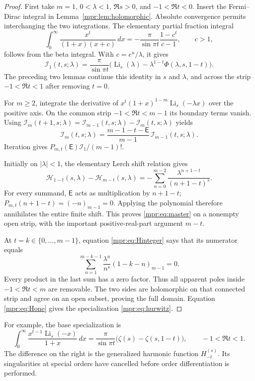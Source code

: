 \begin{proof}
First take $m=1$, $0<\lambda<1$, $\Re s>0$, and $-1<\Re t<0$.
Insert the Fermi--Dirac integral in Lemma~\ref{mpr:lem:holomorphic}.
Absolute convergence permits interchanging the two integrations.  The
elementary partial fraction integral
\[
 \int_0^\infty\frac{x^t}{(1+x)(x+c)}\,dx
  =-\frac{\pi}{\sin\pi t}\frac{1-c^t}{c-1},\qquad c>1,
\]
follows from the beta integral.  With $c=e^u/\lambda$, it gives
\[
 \mathcal I_1(t,s;\lambda)
 =\frac\pi{\sin\pi t}
       \bigl(\operatorname{Li}_s(\lambda)
           -\lambda^{1-t}\Phi(\lambda,s,1-t)\bigr).
\]
The preceding two lemmas continue this identity in $s$ and $\lambda$,
and across the strip $-1<\Re t<1$ after removing $t=0$.

For $m\ge2$, integrate the derivative of
$x^t(1+x)^{1-m}\operatorname{Li}_s(-\lambda x)$ over the positive
axis.  On the common strip $-1<\Re t<m-1$ its boundary terms vanish.
Using $\mathcal I_m(t+1,s;\lambda)
=\mathcal I_{m-1}(t,s;\lambda)-\mathcal I_m(t,s;\lambda)$ yields
\begin{equation}\label{mpr:eq:recurrence}
 \mathcal I_m(t,s;\lambda)
 =\frac{m-1-t-\mathsf E}{m-1}\,
                     \mathcal I_{m-1}(t,s;\lambda).
\end{equation}
Iteration gives $P_{m,t}(\mathsf E)\mathcal I_1/(m-1)!$.

Initially on $|\lambda|<1$, the elementary Lerch shift relation gives
\[
 \mathcal H_{1-t}(s,\lambda)-\mathcal H_{m-t}(s,\lambda)
   =-\sum_{n=0}^{m-2}
       \frac{\lambda^{n+1-t}}{(n+1-t)^s}.
\]
For every summand, $\mathsf E$ acts as multiplication by $n+1-t$;
$P_{m,t}(n+1-t)=(-n)_{m-1}=0$.  Applying the polynomial therefore
annihilates the entire finite shift.  This proves
\eqref{mpr:eq:master} on a nonempty open strip, with the important
positive-real-part argument $m-t$.

At $t=k\in\{0,\ldots,m-1\}$, equation
\eqref{mpr:eq:Hinteger} says that its numerator equals
\[
 \sum_{n=1}^{m-k-1}\frac{\lambda^n}{n^s}
                    (1-k-n)_{m-1}=0.
\]
Every product in the last sum has a zero factor.  Thus all apparent
poles inside $-1<\Re t<m$ are removable.  The two sides are
holomorphic on that connected strip and agree on an open subset, proving
the full domain.  Equation \eqref{mpr:eq:Hone} gives the specialization
\eqref{mpr:eq:hurwitz}.
\end{proof}

For example, the base specialization is
\begin{equation}\label{mpr:eq:base}
 \int_0^\infty\frac{x^{t-1}\operatorname{Li}_s(-x)}{1+x}\,dx
  =\frac\pi{\sin\pi t}\bigl(\zeta(s)-\zeta(s,1-t)\bigr),
 \qquad -1<\Re t<1.
\end{equation}
The difference on the right is the generalized harmonic function
$H_{-t}^{(s)}$.  Its singularities at special orders have cancelled
before order differentiation is performed.

